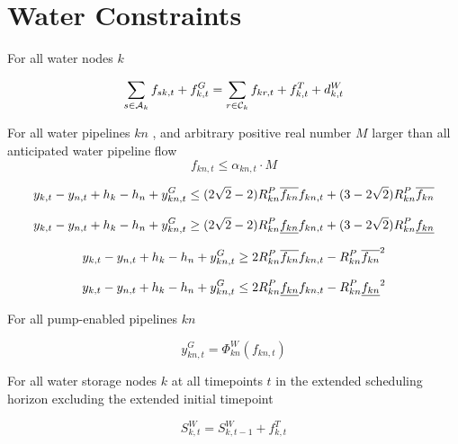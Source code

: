 \section{Water Constraints}

For all water nodes $k$ \atallt{}

\begin{equation}
  \sum_{s \in \mathcal A_k} f_{sk,t} + f^G_{k,t} = \sum_{r \in \mathcal C_k} f_{kr,t} +
  f^T_{k,t} + d^W_{k,t}
\end{equation}

For all water pipelines $kn$ \atallt{}, and arbitrary positive real number $M$
larger than all anticipated water pipeline flow
\begin{equation}
  f_{kn,t} \leq \alpha_{kn,t} \cdot M
\end{equation}

\begin{equation}
  y_{k,t} - y_{n,t} + h_k - h_n + y^G_{kn,t}
  \leq
  (2\sqrt{2} - 2) R^P_{kn} \overline{f_{kn}} f_{kn,t} +
  (3 - 2\sqrt{2}) R^P_{kn} \overline{f_{kn}}
\end{equation}

\begin{equation}
  y_{k,t} - y_{n,t} + h_k - h_n + y^G_{kn,t}
  \geq
  (2\sqrt{2} - 2) R^P_{kn} \underline{f_{kn}} f_{kn,t} +
  (3 - 2\sqrt{2}) R^P_{kn} \underline{f_{kn}}
\end{equation}

\begin{equation}
  y_{k,t} - y_{n,t} + h_k - h_n + y^G_{kn,t}
  \geq
  2 R^P_{kn} \overline{f_{kn}} f_{kn,t} - R^P_{kn}\overline{f_{kn}}^2
\end{equation}

\begin{equation}
  y_{k,t} - y_{n,t} + h_k - h_n + y^G_{kn,t}
  \leq
  2 R^P_{kn} \underline{f_{kn}} f_{kn,t} - R^P_{kn}\underline{f_{kn}}^2
\end{equation}

For all pump-enabled pipelines $kn$

\begin{equation}
  y^G_{kn,t} = \Phi^W_{kn}(f_{kn,t})
\end{equation}

For all water storage nodes $k$ at all timepoints $t$ in the extended scheduling
horizon excluding the extended initial timepoint

\begin{equation}
  S^W_{k,t} = S^W_{k,t-1} + f^T_{k,t}
\end{equation}
